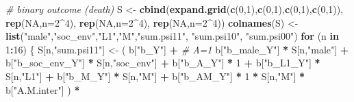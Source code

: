 \documentclass[
]{book}
\newenvironment{Shaded}{\begin{snugshade}}{\end{snugshade}}
\newcommand{\AttributeTok}[1]{\textcolor[rgb]{0.13,0.29,0.53}{#1}}
\newcommand{\CommentTok}[1]{\textcolor[rgb]{0.56,0.35,0.01}{\textit{#1}}}
\newcommand{\ConstantTok}[1]{\textcolor[rgb]{0.56,0.35,0.01}{#1}}
\newcommand{\ControlFlowTok}[1]{\textcolor[rgb]{0.13,0.29,0.53}{\textbf{#1}}}
\newcommand{\DecValTok}[1]{\textcolor[rgb]{0.00,0.00,0.81}{#1}}
\newcommand{\FunctionTok}[1]{\textcolor[rgb]{0.13,0.29,0.53}{\textbf{#1}}}
\newcommand{\NormalTok}[1]{#1}
\newcommand{\OtherTok}[1]{\textcolor[rgb]{0.56,0.35,0.01}{#1}}
\newcommand{\SpecialCharTok}[1]{\textcolor[rgb]{0.81,0.36,0.00}{\textbf{#1}}}
\newcommand{\StringTok}[1]{\textcolor[rgb]{0.31,0.60,0.02}{#1}}
\begin{document}
\begin{Shaded}
\begin{Highlighting}[]
  \CommentTok{\# binary outcome (death)}
\NormalTok{  S }\OtherTok{\textless{}{-}} \FunctionTok{cbind}\NormalTok{(}\FunctionTok{expand.grid}\NormalTok{(}\FunctionTok{c}\NormalTok{(}\DecValTok{0}\NormalTok{,}\DecValTok{1}\NormalTok{),}\FunctionTok{c}\NormalTok{(}\DecValTok{0}\NormalTok{,}\DecValTok{1}\NormalTok{),}\FunctionTok{c}\NormalTok{(}\DecValTok{0}\NormalTok{,}\DecValTok{1}\NormalTok{),}\FunctionTok{c}\NormalTok{(}\DecValTok{0}\NormalTok{,}\DecValTok{1}\NormalTok{)), }\FunctionTok{rep}\NormalTok{(}\ConstantTok{NA}\NormalTok{,}\AttributeTok{n=}\DecValTok{2}\SpecialCharTok{\^{}}\DecValTok{4}\NormalTok{), }\FunctionTok{rep}\NormalTok{(}\ConstantTok{NA}\NormalTok{,}\AttributeTok{n=}\DecValTok{2}\SpecialCharTok{\^{}}\DecValTok{4}\NormalTok{), }
             \FunctionTok{rep}\NormalTok{(}\ConstantTok{NA}\NormalTok{,}\AttributeTok{n=}\DecValTok{2}\SpecialCharTok{\^{}}\DecValTok{4}\NormalTok{))}
  \FunctionTok{colnames}\NormalTok{(S) }\OtherTok{\textless{}{-}} \FunctionTok{list}\NormalTok{(}\StringTok{"male"}\NormalTok{,}\StringTok{"soc\_env"}\NormalTok{,}\StringTok{"L1"}\NormalTok{,}\StringTok{"M"}\NormalTok{,}\StringTok{"sum.psi11"}\NormalTok{, }\StringTok{"sum.psi10"}\NormalTok{, }\StringTok{"sum.psi00"}\NormalTok{)}
  \ControlFlowTok{for}\NormalTok{ (n }\ControlFlowTok{in} \DecValTok{1}\SpecialCharTok{:}\DecValTok{16}\NormalTok{) \{}
\NormalTok{    S[n,}\StringTok{"sum.psi11"}\NormalTok{] }\OtherTok{\textless{}{-}}\NormalTok{  ( b[}\StringTok{"b\_Y"}\NormalTok{] }\SpecialCharTok{+}                                            \CommentTok{\# A=1}
\NormalTok{                             b[}\StringTok{"b\_male\_Y"}\NormalTok{] }\SpecialCharTok{*}\NormalTok{ S[n,}\StringTok{"male"}\NormalTok{] }\SpecialCharTok{+} 
\NormalTok{                             b[}\StringTok{"b\_soc\_env\_Y"}\NormalTok{] }\SpecialCharTok{*}\NormalTok{ S[n,}\StringTok{"soc\_env"}\NormalTok{] }\SpecialCharTok{+} 
\NormalTok{                             b[}\StringTok{"b\_A\_Y"}\NormalTok{] }\SpecialCharTok{*} \DecValTok{1} \SpecialCharTok{+} 
\NormalTok{                             b[}\StringTok{"b\_L1\_Y"}\NormalTok{] }\SpecialCharTok{*}\NormalTok{ S[n,}\StringTok{"L1"}\NormalTok{] }\SpecialCharTok{+}
\NormalTok{                             b[}\StringTok{"b\_M\_Y"}\NormalTok{] }\SpecialCharTok{*}\NormalTok{ S[n,}\StringTok{"M"}\NormalTok{] }\SpecialCharTok{+}
\NormalTok{                             b[}\StringTok{"b\_AM\_Y"}\NormalTok{] }\SpecialCharTok{*} \DecValTok{1} \SpecialCharTok{*}\NormalTok{ S[n,}\StringTok{"M"}\NormalTok{] }\SpecialCharTok{*}\NormalTok{ b[}\StringTok{"A.M.inter"}\NormalTok{] ) }\SpecialCharTok{*}

\end{Highlighting}
\end{Shaded}
\end{document}
